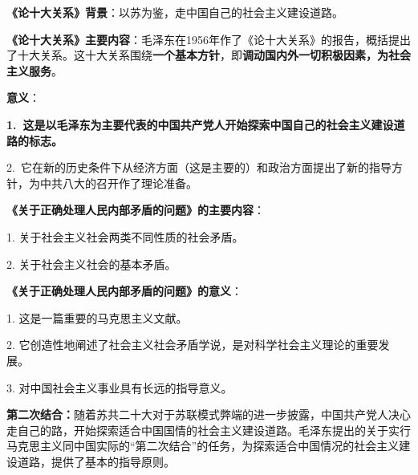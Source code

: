 {\textbf{{《论十大关系》背景}}：以苏为鉴，走中国自己的社会主义建设道路。}

{\textbf{{《论十大关系》主要内容}}{：毛泽东在1956年作了《论十大关系》的报告，概括提出了十大关系。这十大关系围绕}\textbf{{一个基本方针}}{，即}\textbf{{调动国内外一切积极因素，为社会主义服务}}{。}}

{\textbf{{意义}}{：}}

{\textbf{{1.~}{这是以毛泽东为主要代表的中国共产党人开始探索中国自己的社会主义建设道路的标志。}}{\\
}}

{2.~它在新的历史条件下从经济方面（这是主要的）和政治方面提出了新的指导方针，为中共八大的召开作了理论准备。}

{\textbf{{《关于正确处理人民内部矛盾的问题》的主要内容}}：}

{1. 关于社会主义社会两类不同性质的社会矛盾。}

{2. 关于社会主义社会的基本矛盾。~}

{\textbf{{《关于正确处理人民内部矛盾的问题》的意义}}：}

{1. 这是一篇重要的马克思主义文献。}

{2.
它创造性地阐述了社会主义社会矛盾学说，是对科学社会主义理论的重要发展。}

{3. 对中国社会主义事业具有长远的指导意义。}

{\textbf{{第二次结合}：}{随着苏共二十大对于苏联模式弊端的进一步披露，中国共产党人决心走自己的路，}{开始探索适合中国国情的社会主义建设道路}{。}{毛泽东提出的关于实行马克思主义同中国实际的``第二次结合''的任务}{，为探索适合中国情况的社会主义建设道路，提供了基本的指导原则。}}

